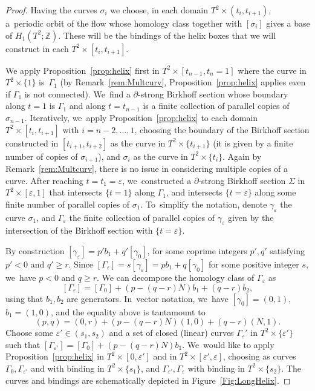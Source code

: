 \documentclass[10pt]{amsart}
\theoremstyle{definition}
\begin{document}
\begin{proof}
Having the curves $\sigma_i$ we choose, in each domain $T^2\times (t_i, t_{i+1})$, a~periodic orbit of the flow whose homology class together with $[\sigma_i]$ gives a base of $H_1(T^2;\mathbb{Z})$. These will be the bindings of the helix boxes that we will construct in each $T^2\times [t_i, t_{i+1}]$.

We apply Proposition~\ref{prop:helix} first in $T^2\times [t_{n-1},t_n=1]$ where the curve in $T^2\times \{1\}$ is~$\Gamma_1$ (by Remark~\ref{rem:Multcurv}, Proposition~\ref{prop:helix} applies even if $\Gamma_1$ is not connected). We~find a $\partial$-strong Birkhoff section whose boundary along $t=1$ is $\Gamma_1$ and along $t=t_{n-1}$ is a finite collection of parallel copies of $\sigma_{n-1}$. Iteratively, we~apply Proposition~\ref{prop:helix} to each domain $T^2\times [t_i,t_{i+1}]$ with $i=n-2,\dots,1$, choosing the boundary of the Birkhoff section constructed in $[t_{i+1},t_{i+2}]$ as the curve in $T^2\times \{t_{i+1}\}$ (it is given by a finite number of copies of $\sigma_{i+1}$), and $\sigma_i$ as the curve in $T^2\times \{t_i\}$. Again by Remark~\ref{rem:Multcurv}, there is no issue in considering multiple copies of a curve. After reaching $t=t_1=\varepsilon$, we~constructed a $\partial$-strong Birkhoff section $\Sigma$ in $T^2\times [\varepsilon,1]$ that intersects $\{t=1\}$ along $\Gamma_1$, and intersects $\{t=\varepsilon\}$ along some finite number of parallel copies of $\sigma_1$. To~simplify the notation, denote $\gamma_\varepsilon$ the curve $\sigma_1$, and $\Gamma_\varepsilon$ the finite collection of parallel copies of $\gamma_\varepsilon$ given by the intersection of the Birkhoff section with $\{t=\varepsilon\}$.

By construction $[\gamma_\varepsilon]= p' b_1 + q' [\gamma_0]$,
for some coprime integers $p',q'$ satisfying $p'<0$ and $q'\geq r$. Since
$[\Gamma_\varepsilon]= s[\gamma_\varepsilon]=pb_1+q[\gamma_0]$
for some positive integer $s$, we~have $p<0$ and $q\geq r$.
We can decompose the homology class of $\Gamma_\varepsilon$ as
\[
[\Gamma_\varepsilon]= [\Gamma_0] + (p-(q-r)N)b_1 + (q-r)b_2,
\]
using that $b_1,b_2$ are generators. In~vector notation, we~have $[\gamma_0]=(0,1)$, $b_1=(1,0)$, and the equality above is tantamount to
\[
(p,q)= (0,r) + (p-(q-r)N)(1,0) + (q-r) (N,1).
\]
Choose some $\varepsilon'\in (s_1,s_2)$ and a set of closed (linear) curves $\Gamma_\varepsilon'$ in $T^2\times \{\varepsilon'\}$ such that $[\Gamma_{\varepsilon'}]=[\Gamma_0]+(p-(q-r)N)b_1$. We~would like to apply Proposition~\ref{prop:helix} in $T^2\times [0,\varepsilon']$ and in $T^2\times [\varepsilon',\varepsilon]$, choosing as curves $\Gamma_0, \Gamma_{\varepsilon'}$ and with binding in $T^2\times \{s_1\}$, and $\Gamma_{\varepsilon'}, \Gamma_{\varepsilon}$ with binding in $T^2\times \{s_2\}$. The curves and bindings are schematically depicted in Figure~\ref{Fig:LongHelix}.


\end{proof}
\end{document}
